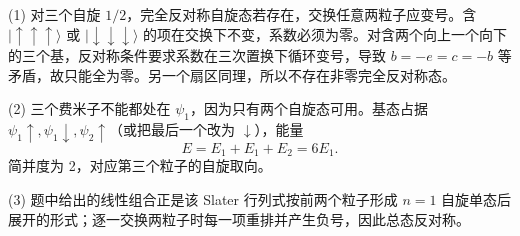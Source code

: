\begin{solution}

(1) 对三个自旋 $1/2$，完全反对称自旋态若存在，交换任意两粒子应变号。含 $|\uparrow\uparrow\uparrow\rangle$ 或 $|\downarrow\downarrow\downarrow\rangle$ 的项在交换下不变，系数必须为零。对含两个向上一个向下的三个基，反对称条件要求系数在三次置换下循环变号，导致 $b=-e=c=-b$ 等矛盾，故只能全为零。另一个扇区同理，所以不存在非零完全反对称态。

(2) 三个费米子不能都处在 $\psi_1$，因为只有两个自旋态可用。基态占据 $\psi_1\uparrow,\psi_1\downarrow,\psi_2\uparrow$（或把最后一个改为 $\downarrow$），能量
\[
E=E_1+E_1+E_2=6E_1.
\]
简并度为 2，对应第三个粒子的自旋取向。

(3) 题中给出的线性组合正是该 Slater 行列式按前两个粒子形成 $n=1$ 自旋单态后展开的形式；逐一交换两粒子时每一项重排并产生负号，因此总态反对称。

\end{solution}

